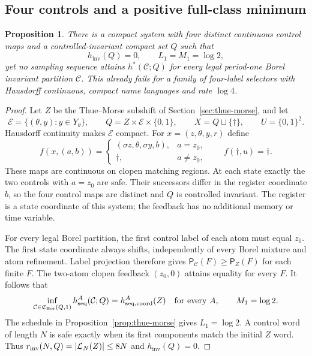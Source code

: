 \documentclass[11pt,reqno]{amsart}
\numberwithin{equation}{section}
\newtheorem{proposition}[theorem]{Proposition}
\theoremstyle{definition}
\newcommand{\C}{\mathcal C}
\newcommand{\Patt}{\mathsf P}
\newcommand{\hseq}{h_{\mathrm{seq}}}
\newcommand{\hpat}{h^{*}}
\newcommand{\hinv}{h_{\mathrm{inv}}}
\newcommand{\Bor}{\mathrm{Bor}}
\begin{document}
\subsection{Four controls and a positive full-class minimum}

\begin{proposition}\label{prop:finite-pointwise}
There is a compact system with four distinct continuous control
maps and a controlled-invariant compact set $Q$ such that
\[
 \hinv(Q)=0,\qquad L_1=M_1=\log2,
\]
yet no sampling sequence attains $\hpat(\C;Q)$ for every legal
period-one Borel invariant partition $\C$.
This already fails for a family of four-label selectors with
Hausdorff continuous, compact name languages and rate $\log4$.
\end{proposition}
\begin{proof}
Let $Z$ be the Thue--Morse subshift of
Section~\ref{sec:thue-morse}, and let
\[
 \mathcal E=\{(\theta,y):y\in Y_\theta\},\qquad
 Q=Z\times\mathcal E\times\{0,1\},\qquad
 X=Q\sqcup\{\dagger\},\qquad U=\{0,1\}^2.
\]
Hausdorff continuity makes $\mathcal E$ compact.
For $x=(z,\theta,y,r)$ define
\[
 f(x,(a,b))=
 \begin{cases}
  (\sigma z,\theta,\sigma y,b),&a=z_0,\\
  \dagger,&a\ne z_0,
 \end{cases}
 \qquad f(\dagger,u)=\dagger.
\]
These maps are continuous on clopen matching regions. At each
state exactly the two controls with $a=z_0$ are safe. Their
successors differ in the register coordinate $b$, so the four
control maps are distinct and $Q$ is controlled invariant.
The register is a state coordinate of this system; the feedback
has no additional memory or time variable.

For every legal Borel partition, the first control label of
each atom must equal $z_0$. The first state coordinate always
shifts, independently of every Borel mixture and atom refinement.
Label projection therefore gives
$\Patt_\C(F)\ge\Patt_Z(F)$ for each finite $F$.
The two-atom clopen feedback $(z_0,0)$ attains equality for
every $F$. It follows that
\[
 \inf_{\C\in\mathfrak C_{\Bor}(Q,1)}\hseq^A(\C;Q)
 =h_{\rm seq,coord}^A(Z)\quad\text{for every }A,
 \qquad M_1=\log2.
\]
The schedule in Proposition~\ref{prop:thue-morse} gives
$L_1=\log2$. A control word of length $N$ is safe exactly
when its first components match the initial $Z$ word.
Thus $r_{\rm inv}(N,Q)=|\mathcal L_N(Z)|\le8N$ and $\hinv(Q)=0$.


\end{proof}
\end{document}
